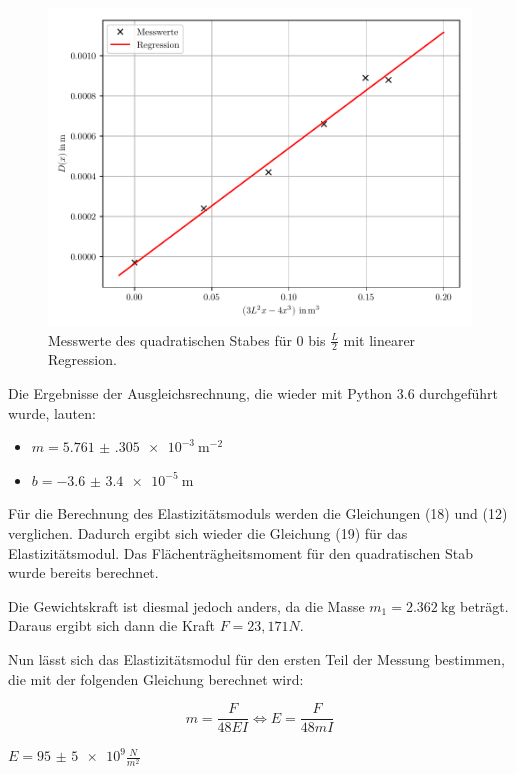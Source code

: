 \begin{figure}[H]
  \centering
  \includegraphics[width=\textwidth]{ausgleichsgerade3.pdf}
  \caption{Messwerte des quadratischen Stabes für $0$ bis $\frac{L}{2}$ mit linearer Regression.}
\end{figure}

Die Ergebnisse der Ausgleichsrechnung, die wieder mit Python 3.6 durchgeführt wurde,
lauten:

\begin{itemize}
  \item $m = \SI{5.761(305)e-3}{\meter\tothe{-2}}$
  \item $b = \SI{-3.6(34)e-5}{\meter}$
\end{itemize}

Für die Berechnung des Elastizitätsmoduls werden die Gleichungen (18) und (12)
verglichen. Dadurch ergibt sich wieder die Gleichung (19) für das Elastizitätsmodul.
Das Flächenträgheitsmoment für den quadratischen Stab wurde bereits berechnet.

Die Gewichtskraft ist diesmal jedoch anders, da die Masse $m_1 = \SI{2.362}{\kilo\gram}$
beträgt. Daraus ergibt sich dann die Kraft $F = 23,171N$.

Nun lässt sich das Elastizitätsmodul für den ersten Teil der Messung bestimmen,
die mit der folgenden Gleichung berechnet wird:

\begin{equation}
  m = \frac{F}{48EI} \iff E = \frac{F}{48mI}
\end{equation}

\centerline{$E = \num{95(5)e9} \frac{N}{m^2}$}\ \\

